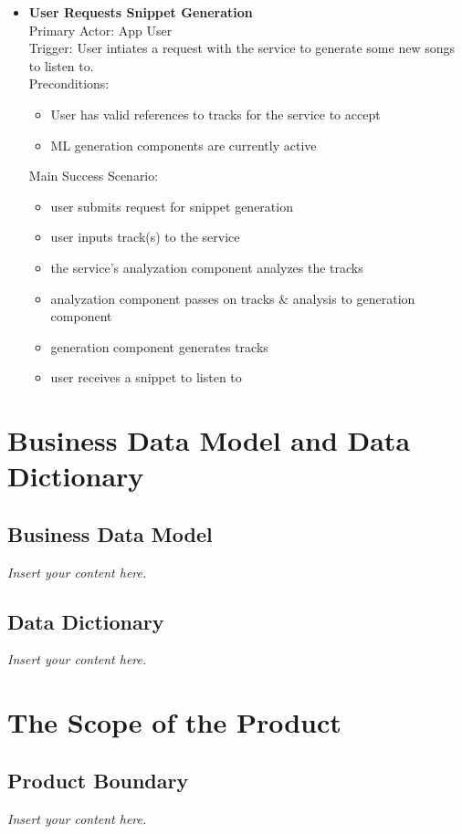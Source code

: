 \documentclass[12pt]{article}
\newcommand{\lips}{\textit{Insert your content here.}}
\begin{document}
\begin{itemize}
  \item \textbf{User Requests Snippet Generation}
    \\Primary Actor: App User
    \\Trigger: User intiates a request with the service to generate some new songs to listen to. 
    \\Preconditions: 
    \begin{itemize}
    \item User has valid references to tracks for the service to accept
    \item ML generation components are currently active
    \end{itemize}

    Main Success Scenario: 
    \begin{itemize}
    \item user submits request for snippet generation
    \item user inputs track(s) to the service
    \item the service's analyzation component analyzes the tracks
    \item analyzation component passes on tracks \& analysis to generation component
    \item generation component generates tracks
    \item user receives a snippet to listen to
    \end{itemize}
\end{itemize}



\section{Business Data Model and Data Dictionary}
\subsection{Business Data Model}
\lips
\subsection{Data Dictionary}
\lips

\section{The Scope of the Product}
\subsection{Product Boundary}
\lips
\end{document}

